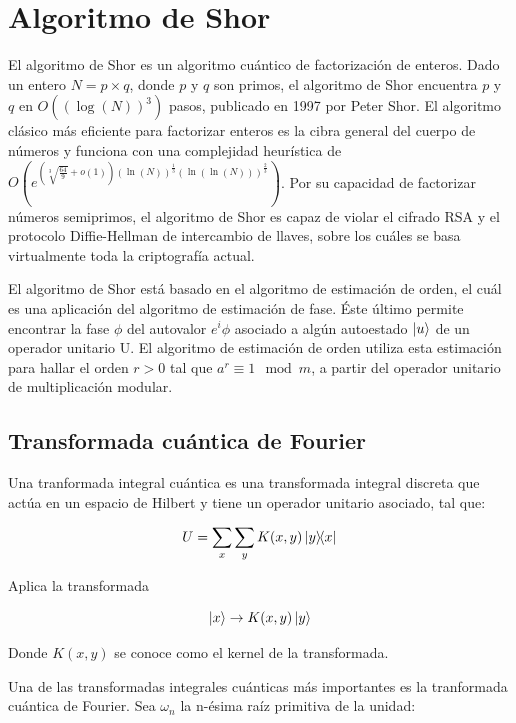 \chapter{Algoritmo de Shor}

El algoritmo de Shor es un algoritmo cuántico de factorización de enteros. Dado un entero $N=p \times q$, donde $p$ y $q$ son primos, el algoritmo de Shor encuentra $p$ y $q$ en $O((\log(N))^3)$ pasos, publicado en 1997 por Peter Shor. El algoritmo clásico más eficiente para factorizar enteros es la cibra general del cuerpo de números y funciona con una complejidad heurística de $O(e^{(\sqrt[3]{\frac{64}{9}}+o(1))(\ln(N))^{\frac{1}{3}}(\ln(\ln(N)))^{\frac{2}{3}}})$. Por su capacidad de factorizar números semiprimos, el algoritmo de Shor es capaz de violar el cifrado RSA y el protocolo Diffie-Hellman de intercambio de llaves, sobre los cuáles se basa virtualmente toda la criptografía actual.

El algoritmo de Shor está basado en el algoritmo de estimación de orden, el cuál es una aplicación del algoritmo de estimación de fase. Éste último permite encontrar la fase $\phi$ del autovalor $e^i \phi$ asociado a algún autoestado $\ket{u}$ de un operador unitario U. El algoritmo de estimación de orden utiliza esta estimación para hallar el orden $r>0$ tal que $a^r \equiv 1 \mod m$, a partir del operador unitario de multiplicación modular.

\section{Transformada cuántica de Fourier}

Una tranformada integral cuántica es una transformada integral discreta que actúa en un espacio de Hilbert y tiene un operador unitario asociado, tal que:

\begin{equation}
    U = \sum\limits_x\sum\limits_y K(x,y) \ketbra{y}{x}
\end{equation}

Aplica la transformada

\begin{equation}
    \ket{x} \rightarrow K(x,y) \ket{y}
\end{equation}

Donde $K(x,y)$ se conoce como el kernel de la transformada.

Una de las transformadas integrales cuánticas más importantes es la tranformada cuántica de Fourier. Sea $\omega_n$ la n-ésima raíz primitiva de la unidad:

